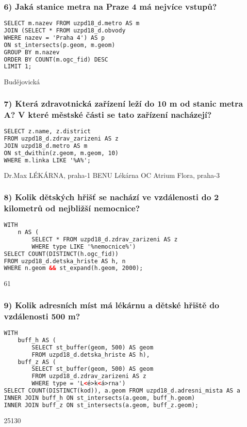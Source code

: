 \documentclass[a4paper, 12pt]{article}
\begin{document}
\subsubsection*{6) Jaká stanice metra na Praze 4 má nejvíce vstupů?}
\begin{lstlisting}[language=html]
SELECT m.nazev FROM uzpd18_d.metro AS m
JOIN (SELECT * FROM uzpd18_d.obvody 
WHERE nazev = 'Praha 4') AS p
ON st_intersects(p.geom, m.geom)
GROUP BY m.nazev
ORDER BY COUNT(m.ogc_fid) DESC
LIMIT 1;
\end{lstlisting}
Budějovická
\vspace{0.8cm}

\subsubsection*{7) Která zdravotnická zařízení leží do 10 m od stanic metra A? V které městské části se tato zařízení nacházejí?}
\begin{lstlisting}[language=html]
SELECT z.name, z.district 
FROM uzpd18_d.zdrav_zarizeni AS z
JOIN uzpd18_d.metro AS m
ON st_dwithin(z.geom, m.geom, 10)
WHERE m.linka LIKE '%A%';
\end{lstlisting}
\begin{flushleft}
Dr.Max LÉKÁRNA, praha-1\linebreak
BENU Lékárna OC Atrium Flora, praha-3
\end{flushleft}
\vspace{0.009cm}

\subsubsection*{8) Kolik dětských hřišť se nachází ve vzdálenosti do 2 kilometrů od nejbližší nemocnice?}
\begin{lstlisting}[language=html]
WITH 
    n AS (
        SELECT * FROM uzpd18_d.zdrav_zarizeni AS z 
        WHERE type LIKE '%nemocnice%')
SELECT COUNT(DISTINCT(h.ogc_fid)) 
FROM uzpd18_d.detska_hriste AS h, n
WHERE n.geom && st_expand(h.geom, 2000);
\end{lstlisting}
61
\vspace{0.8cm}

\subsubsection*{9) Kolik adresních míst má lékárnu a dětské hřiště do vzdálenosti 500 m?}
\begin{lstlisting}[language=html]
WITH
    buff_h AS (
        SELECT st_buffer(geom, 500) AS geom 
        FROM uzpd18_d.detska_hriste AS h),
    buff_z AS (
        SELECT st_buffer(geom, 500) AS geom 
        FROM uzpd18_d.zdrav_zarizeni AS z
        WHERE type = 'L<é>k<á>rna') 
SELECT COUNT(DISTINCT(kod)), a.geom FROM uzpd18_d.adresni_mista AS a
INNER JOIN buff_h ON st_intersects(a.geom, buff_h.geom)
INNER JOIN buff_z ON st_intersects(a.geom, buff_z.geom);
\end{lstlisting}
25130
\vspace{0.8cm}
\end{document}
